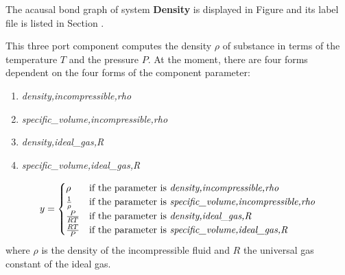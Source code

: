 

   The acausal bond graph of system \textbf{Density} is
   displayed in Figure  and its label
   file is listed in Section .

This three port component computes the density $\rho$ of substance in
terms of the temperature $T$ and the pressure $P$. At the moment,
there are four forms dependent on the four forms of the component parameter:
\begin{enumerate}
\item \emph{density,incompressible,rho}
\item \emph{specific\_volume,incompressible,rho}
\item \emph{density,ideal\_gas,R}
\item \emph{specific\_volume,ideal\_gas,R}
\end{enumerate}

\begin{equation}
  y = 
  \begin{cases}
    \rho & \text{if the parameter is
      \emph{density,incompressible,rho}}\\
    \frac{1}{\rho} & \text{if the parameter is
      \emph{specific\_volume,incompressible,rho}}\\
    \frac{P}{RT} & \text{if the parameter is \emph{density,ideal\_gas,R}}\\
    \frac{RT}{P} & \text{if the parameter is
      \emph{specific\_volume,ideal\_gas,R}}
  \end{cases}
\end{equation}
where $\rho$ is the density of the incompressible fluid and $R$ the
universal gas constant of the ideal gas.
